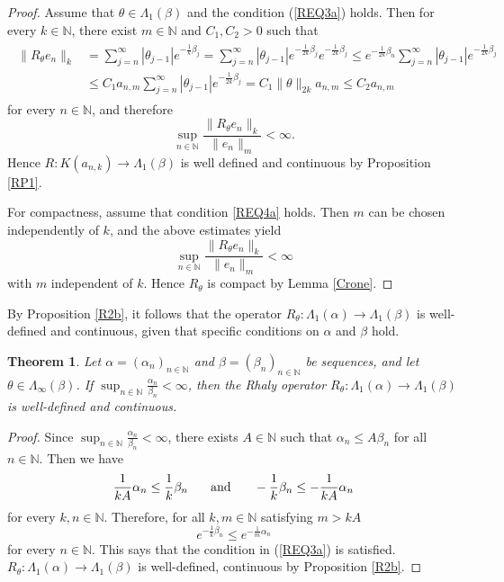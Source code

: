 \documentclass{birkjour}
\newtheorem{thm}{Theorem}[section]
\theoremstyle{definition}
\theoremstyle{remark}
\numberwithin{equation}{section}
\begin{document}
\begin{proof} Assume that $\theta\in \Lambda_{1}(\beta)$ and the condition (\ref{REQ3a}) holds. Then for every $k\in \mathbb{N}$, there exist $m\in \mathbb{N}$ and $C_{1}, C_{2}>0$ such that
\begin{align*}
\begin{split}
\|R_{\theta}e_{n}\|_{k}&=\sum^{\infty}_{j=n} |\theta_{j-1}|e^{-\frac{1}{k}\beta_{j}} =\sum^{\infty}_{j=n} |\theta_{j-1}|e^{-\frac{1}{2k}\beta_{j}}e^{-\frac{1}{2k}\beta_{j}} \leq  e^{-\frac{1}{2k}\beta_{n}}\sum^{\infty}_{j=n} |\theta_{j-1}|e^{-\frac{1}{2k}\beta_{j}} 
\\
&  \leq C_{1}a_{n,m} \sum^{\infty}_{j=n} |\theta_{j-1}|e^{-\frac{1}{2k}\beta_{j}}=C_{1}\|\theta\|_{2k}a_{n,m}\leq C_{2}a_{n,m}
\end{split}
\end{align*}
for every $n\in \mathbb{N}$, and therefore $$ \sup_{n\in \mathbb{N}}\frac{\|R_{\theta}e_{n}\|_{k}}{\|e_{n}\|_{m}}< \infty.$$
Hence $R:K(a_{n,k})\to \Lambda_{1}(\beta)$  is well defined and continuous by Proposition \ref{RP1}.

For compactness, assume that condition \eqref{REQ4a} holds. Then $m$ can 
be chosen independently of $k$, and the above estimates yield
$$\sup_{n\in \mathbb{N}}\frac{\|R_{\theta}e_{n}\|_{k}}{\|e_{n}\|_{m}}< \infty$$
with $m$ independent of $k$. Hence $R_{\theta}$ is compact by 
Lemma \ref{Crone}.
\end{proof}


By Proposition \ref{R2b}, it follows that the operator $R_{\theta}:\Lambda_{1}(\alpha) \to \Lambda_{1}(\beta)$ is well-defined and continuous, given that specific conditions on $\alpha$ and $\beta$ hold.

\begin{thm}\label{Thm2} Let $\alpha=(\alpha_n)_{n\in\mathbb{N}}$ and $\beta=(\beta_{n})_{n\in \mathbb{N}}$ 
be sequences, and let $\theta\in \Lambda_{\infty}(\beta)$. 
If $\displaystyle\sup_{n\in\mathbb{N}}\frac{\alpha_n}{\beta_n}<\infty$, then 
the Rhaly operator $R_{\theta}:\Lambda_{1}(\alpha)\to \Lambda_{1}(\beta)$ is well-defined and continuous.
\end{thm}
\begin{proof}  Since $\displaystyle \sup_{n\in\mathbb{N}}\frac{\alpha_n}{\beta_n}<\infty$, there exists 
$A\in \mathbb{N}$ such that 
$\alpha_{n}\leq A\beta_{n}$ for all $n\in \mathbb{N}$. Then we have 
$$ \frac{1}{kA}\alpha_{n}\leq \frac{1}{k}\beta_{n}\hspace{0.25in} \text{and}\hspace{0.25in}-\frac{1}{k}\beta_{n}\leq -\frac{1}{kA}\alpha_{n}$$
for every $k,
n\in \mathbb{N}$.
Therefore, for all $k,m\in \mathbb{N}$ satisfying $m>kA$
$$e^{-\frac{1}{k}\beta_{n}}\leq e^{-\frac{1}{m}\alpha_{n}}$$
for every $n\in \mathbb{N}$. This says that the condition in (\ref{REQ3a}) is satisfied. $R_{\theta}:\Lambda_{1}(\alpha)\to \Lambda_{1}(\beta)$ is well-defined, continuous by Proposition \ref{R2b}.
\end{proof}
\end{document}
